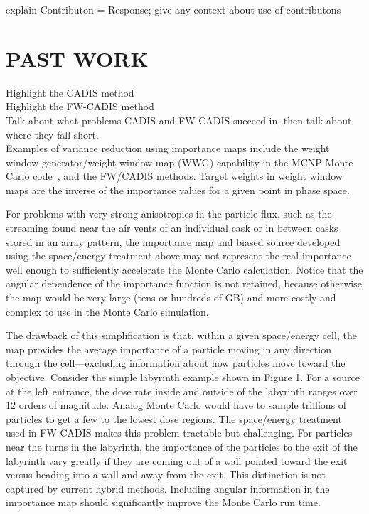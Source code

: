 \documentclass[12pt]{article}
\begin{document}
explain Contributon = Response; give any context about use of contributons \\

\section{PAST WORK}
\label{sect::past}
Highlight the CADIS method \\
Highlight the FW-CADIS method \\
Talk about what problems CADIS and FW-CADIS succeed in, then talk about where they fall short. \\

Examples of variance reduction using importance maps include the weight window generator/weight window map (WWG) capability in the MCNP Monte Carlo code~\cite{brown_mcnp_2002}, and the FW/CADIS methods. Target weights in weight window maps are the inverse of the importance values for a given point in phase space.

For problems with very strong anisotropies in the particle flux, such as the streaming found near the air vents of an individual cask or in between casks stored in an array pattern, the importance map and biased source developed using the space/energy treatment above may not represent the real importance well enough to sufficiently accelerate the Monte Carlo calculation. Notice that the angular dependence of the importance function is not retained, because otherwise the map would be very large (tens or hundreds of GB) and more costly and complex to use in the Monte Carlo simulation. 

The drawback of this simplification is that, within a given space/energy cell, the map provides the average importance of a particle moving in any direction through the cell—excluding information about how particles move toward the objective. Consider the simple labyrinth example shown in Figure 1. For a source at the left entrance, the dose rate inside and outside of the labyrinth ranges over 12 orders of magnitude. Analog Monte Carlo would have to sample trillions of particles to get a few to the lowest dose regions. The space/energy treatment used in FW-CADIS makes this problem tractable but challenging. For particles near the turns in the labyrinth, the importance of the particles to the exit of the labyrinth vary greatly if they are coming out of a wall pointed toward the exit versus heading into a wall and away from the exit. This distinction is not captured by current hybrid methods. Including angular information in the importance map should significantly improve the Monte Carlo run time. 
\end{document}
